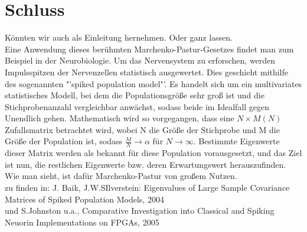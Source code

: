 \documentclass[a4paper, 11pt]{scrreprt}
\begin{document}
\section*{Schluss}
Könnten wir auch als Einleitung hernehmen. Oder ganz lassen.\\
Eine Anwendung dieses berühmten Marchenko-Pastur-Gesetzes findet man zum Beispiel in der Neurobiologie. Um das Nervensystem zu erforschen, werden Impulsspitzen der Nervenzellen statistisch ausgewertet. Dies geschieht mithilfe des sogenannten "'spiked population model"'. Es handelt sich um ein multivariates statistisches Modell, bei dem die Populationsgröße sehr groß ist und die Stichprobenanzahl vergleichbar anwächst, sodass beide im Idealfall gegen Unendlich gehen. Mathematisch wird so vorgegangen, dass eine $ N \times M(N) $ Zufallsmatrix betrachtet wird, wobei N die Größe der Stichprobe und M die Größe der Population ist, sodass $ \frac{M}{N} \rightarrow \alpha$ für $N \rightarrow \infty $. Bestimmte Eigenwerte dieser Matrix werden als bekannt für diese Population vorausgesetzt, und das Ziel ist nun, die restlichen Eigenwerte bzw. deren Erwartungswert herauszufinden. Wie man sieht, ist dafür Marchenko-Pastur von großem Nutzen.\\

zu finden in: J. Baik, J.W.SIlverstein: Eigenvalues of Large Sample Covariance Matrices of Spiked Population Models, 2004\\
und S.Johnston u.a., Comparative Investigation into Classical and Spiking Neuorin Implementations on FPGAs, 2005
\end{document}
